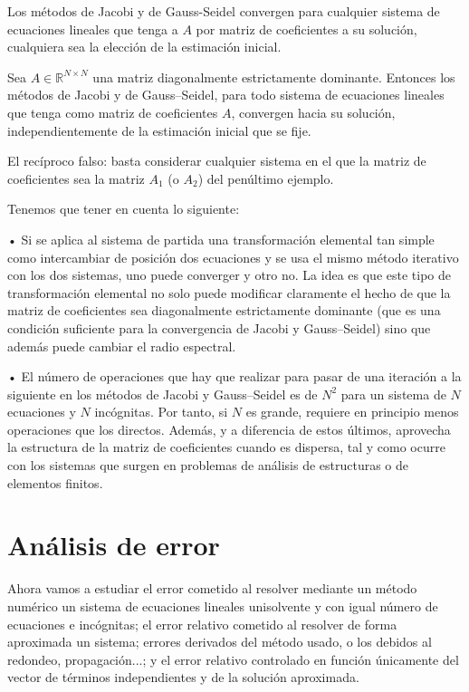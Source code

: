 Los métodos de Jacobi y de Gauss-Seidel convergen para cualquier sistema de ecuaciones lineales que tenga a $A$ por matriz de coeficientes a su solución, cualquiera sea la elección de la estimación inicial.

\begin{nprop}
Sea $A \in \mathbb{R}^{N \times N}$ una matriz diagonalmente estrictamente dominante. Entonces los métodos de Jacobi y de Gauss–Seidel, para todo sistema de ecuaciones lineales que tenga como matriz de coeficientes $A$, convergen hacia su solución, independientemente de la estimación inicial que se fije.
\end{nprop}

El recíproco falso: basta considerar cualquier sistema en el que la matriz de
coeficientes sea la matriz $A_1$ (o $A_2$) del penúltimo ejemplo.

\begin{nota}
Tenemos que tener en cuenta lo siguiente:
	\begin{nlist}
	\item[•] Si se aplica al sistema de partida una transformación elemental tan simple como intercambiar de posición dos ecuaciones y se usa el mismo método iterativo con los dos sistemas, uno puede converger y otro no. La idea es que este tipo de transformación elemental no solo puede modificar claramente el hecho de que la matriz de coeficientes sea diagonalmente estrictamente dominante (que es una condición suficiente para la convergencia de Jacobi y Gauss–Seidel) sino que además puede cambiar el radio espectral.
	\item[•] El número de operaciones que hay que realizar para pasar de una iteración a la siguiente en los métodos de Jacobi y Gauss–Seidel es de $N^2$ para un sistema de $N$ ecuaciones y $N$ incógnitas. Por tanto, si $N$ es grande, requiere en principio menos operaciones que los directos. Además, y a diferencia de estos últimos, aprovecha la estructura de la matriz de coeficientes cuando es dispersa, tal y como ocurre con los sistemas que surgen en problemas de análisis de estructuras o de elementos finitos.
	\end{nlist}
\end{nota}

\section{Análisis de error}
Ahora vamos a estudiar el error cometido al resolver mediante un método numérico un sistema de ecuaciones lineales unisolvente y con igual número de ecuaciones e incógnitas; el error relativo cometido al resolver de forma aproximada un sistema; errores derivados del método usado, o los debidos al redondeo, propagación...; y el error relativo controlado en función únicamente del vector de términos independientes y de la solución aproximada.

